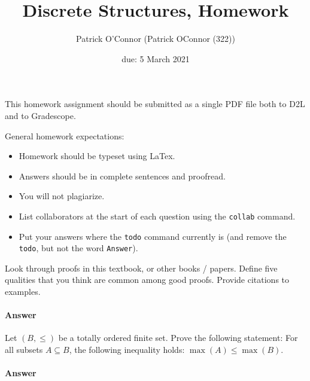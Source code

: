 \documentclass{article}
\title{Discrete Structures, Homework \hwnum}
\author{{Patrick O'Connor} (Patrick OConnor (322))}
\date{due: 5 March 2021}
\begin{document}
\maketitle

This homework assignment should be
submitted as a single PDF file both to D2L and to Gradescope.

General homework expectations:
\begin{itemize}
    \item Homework should be typeset using LaTex.
    \item Answers should be in complete sentences and proofread.
    \item You will not plagiarize.
    \item List collaborators at the start of each question using the \texttt{collab} command.
    \item Put your answers where the \texttt{todo} command currently is (and
        remove the \texttt{todo}, but not the word \texttt{Answer}).
\end{itemize}


\collab{\todo{}} 

Look through proofs in this textbook, or other books / papers.  Define five
qualities that you think are common among good proofs. Provide citations to
examples.


\paragraph{Answer}




\collab{\todo{}} 

Let $(B,\leq)$ be a totally ordered finite set. Prove the following
statement: For all subsets $A \subseteq B$, the following inequality
holds: $\max(A) \leq \max(B)$.

\paragraph{Answer}
\end{document}
